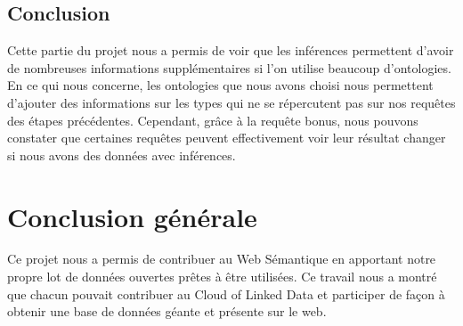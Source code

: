\documentclass[a4paper,10pt]{article}
\begin{document}
\subsection{Conclusion}
Cette partie du projet nous a permis de voir que les inférences permettent d'avoir de nombreuses informations supplémentaires si l'on utilise beaucoup d'ontologies. En ce qui nous concerne, les ontologies que nous avons choisi nous permettent d'ajouter des informations sur les types qui ne se répercutent pas sur nos requêtes des étapes précédentes. Cependant, grâce à la requête bonus, nous pouvons constater que certaines requêtes peuvent effectivement voir leur résultat changer si nous avons des données avec inférences.

\newpage

\newpage
\section{Conclusion générale}
Ce projet nous a permis de contribuer au Web Sémantique en apportant notre propre lot de données ouvertes prêtes à être utilisées.
Ce travail nous a montré que chacun pouvait contribuer au Cloud of Linked Data et participer de façon à obtenir une base de données géante et présente sur le web.
\end{document}
